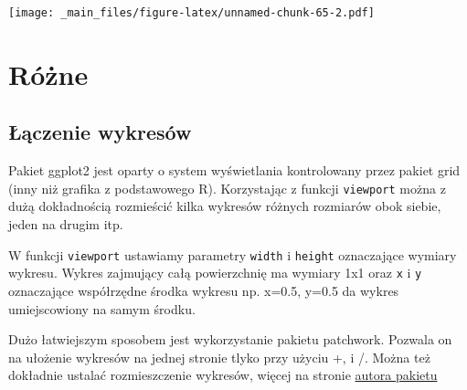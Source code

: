 \documentclass[
]{book}
\begin{document}
\texttt{[image: \_main\_files/figure-latex/unnamed-chunk-65-2.pdf]}

\hypertarget{ruxf3ux17cne}{%
\section{Różne}\label{ruxf3ux17cne}}

\hypertarget{ux142ux105czenie-wykresuxf3w}{%
\subsection{Łączenie wykresów}\label{ux142ux105czenie-wykresuxf3w}}

Pakiet ggplot2 jest oparty o system wyświetlania kontrolowany przez pakiet grid (inny niż grafika z podstawowego R). Korzystając z funkcji \texttt{viewport} można z dużą dokładnością rozmieścić kilka wykresów różnych rozmiarów obok siebie, jeden na drugim itp.

W funkcji \texttt{viewport} ustawiamy parametry \texttt{width} i \texttt{height} oznaczające wymiary wykresu. Wykres zajmujący całą powierzchnię ma wymiary 1x1 oraz \texttt{x} i \texttt{y} oznaczające współrzędne środka wykresu np. x=0.5, y=0.5 da wykres umiejscowiony na samym środku.

Dużo łatwiejszym sposobem jest wykorzystanie pakietu patchwork. Pozwala on na ułożenie wykresów na jednej stronie tlyko przy użyciu +, \textbar{} i /. Można też dokładnie ustalać rozmieszczenie wykresów, więcej na stronie \href{https://patchwork.data-imaginist.com/index.html}{autora pakietu}
\end{document}
